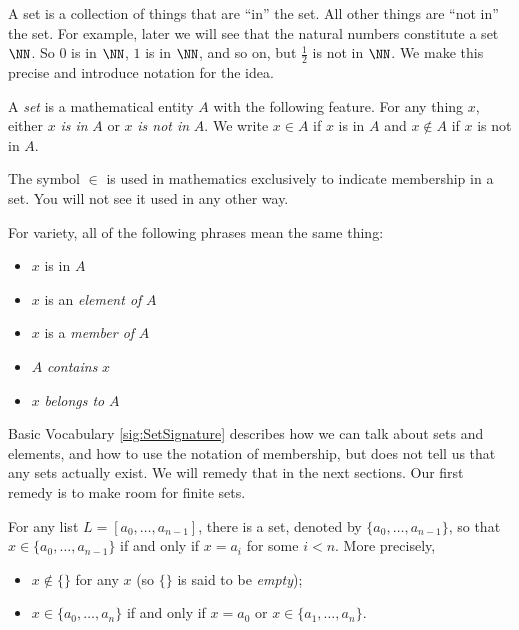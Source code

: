 A set is a collection of things that are ``in'' the set. All other things are ``not in'' the set. 
For example, later we will see that the natural numbers constitute a set $\NN$. 
So $0$ is in $\NN$, $1$ is in $\NN$, and so on, but $\frac{1}2$ is not in $\NN$.
We make this precise and introduce notation for the idea.

\begin{signature}\label{sig:SetSignature}
  A \emph{set} is a mathematical entity $A$ with the following feature. 
  For any thing $x$, either $x$ \emph{is in} $A$ or $x$ \emph{is not in} $A$. 
  We write $x\in A$ if $x$ is in $A$ and $x\notin A$ if $x$ is not in $A$.

The symbol $\in$ is used in mathematics exclusively to indicate membership in a set. 
You will not see it used in any other way.  

For variety, all of the following phrases mean the same thing:
\begin{itemize}
\item $x$ is in $A$
\item $x$ is an \emph{element of} $A$
\item $x$  is a \emph{member of} $A$
\item $A$ \emph{contains} $x$
\item $x$ \emph{belongs to} $A$
\end{itemize}
\end{signature}

Basic Vocabulary \ref{sig:SetSignature} describes how we can talk about sets and elements, and how to use the notation of membership, but does not tell us that any sets actually exist. 
We will remedy that in the next sections.
Our first remedy is to make room for finite sets.

\begin{axiom} For any list $L  = [a_0,\ldots, a_{n-1}]$, there is a set, denoted by $\{a_0,\ldots,a_{n-1}\}$, so
  that $x\in \{a_0,\ldots, a_{n-1}\}$ if and only if $x=a_i$ for some
  $i<n$.  More precisely,
  \begin{itemize}
  \item $x\notin \{\}$ for any $x$ (so $\{\}$ is said to be \emph{empty});
  \item $x\in \{a_0,\ldots,a_n\}$ if and only if $x=a_0$ or $x\in
    \{a_1,\ldots,a_n\}$.
  \end{itemize}
\end{axiom}

